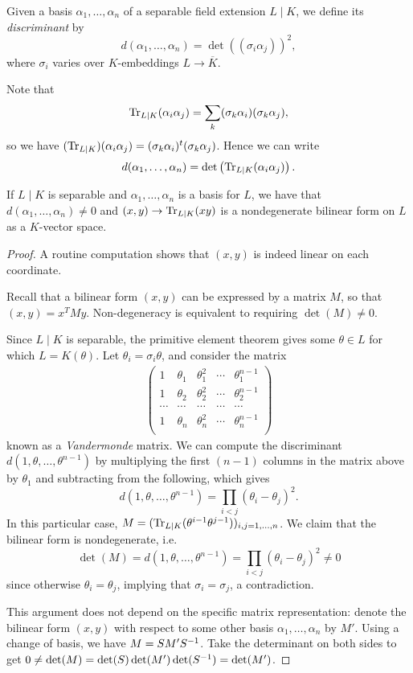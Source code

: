 \begin{defn}
	Given a basis $\alpha_1,\dots,\alpha_n$ of a separable field extension $L\mid K$, we define its \emph{discriminant} by
	\[
		d(\alpha_1,\dots,\alpha_n) = \det((\sigma_i\alpha_j))^2,
	\]
	where $\sigma_i$ varies over $K$-embeddings $L\to\overline{K}$.
\end{defn}

Note that
\[
	\operatorname{Tr}_{L\mid K}(\alpha_i\alpha_j) = \sum_k(\sigma_k\alpha_i)(\sigma_k\alpha_j),
\]
so we have $(\operatorname{Tr}_{L\mid K})(\alpha_i\alpha_j)=(\sigma_k\alpha_i)^t(\sigma_k\alpha_j)$. Hence we can write
\[
	d(\alpha_1,\dots,\alpha_n)=\det\left(\operatorname{Tr}_{L\mid K}(\alpha_i\alpha_j)\right).
\]


\begin{prop}
	If $L\mid K$ is separable and $\alpha_1,\dots,\alpha_n$ is a basis for $L$, we have that $d(\alpha_1,\dots,\alpha_n)\neq 0$ and $(x,y) \to \operatorname{Tr}_{L\mid K}(xy)$ is a nondegenerate bilinear form on $L$ as a $K$-vector space.
\end{prop}
\begin{proof}
	A routine computation shows that $(x,y)$ is indeed linear on each coordinate.

	Recall that a bilinear form $(x,y)$ can be expressed by a matrix $M$, so that $(x,y) = x^T M y$. Non-degeneracy is equivalent to requiring $\det(M)\neq 0$.
	
	Since $L\mid K$ is separable, the primitive element theorem gives some $\theta\in L$ for which $L=K(\theta)$. Let $\theta_i=\sigma_i\theta$, and consider the matrix
	\begin{align*}
	\begin{pmatrix}
		1 & \theta_1 & \theta_1^2 & \cdots & \theta_1^{n-1}\\
		1 & \theta_2 & \theta_2^2 & \cdots & \theta_2^{n-1}\\
		\cdots & \cdots &\cdots &\cdots &\cdots\\
		1 & \theta_n & \theta_n^2 & \cdots & \theta_n^{n-1}\\
	\end{pmatrix}
	\end{align*}
	known as a \emph{Vandermonde} matrix. We can compute the discriminant $d(1,\theta,\dots,\theta^{n-1})$ by multiplying the first $(n-1)$ columns in the matrix above by $\theta_1$ and subtracting from the following, which gives
	\[
		d(1,\theta,\dots,\theta^{n-1}) = \prod_{i<j}(\theta_i-\theta_j)^2.
	\]
	In this particular case, $M=(\operatorname{Tr}_{L\mid K}(\theta^{i-1}\theta^{j-1}))_{i,j=1,\dots,n}$. We claim that the bilinear form is nondegenerate, i.e.
	\[
		\det(M) = d(1,\theta,\dots,\theta^{n-1}) = \prod_{i<j}(\theta_i-\theta_j)^2 \neq 0
	\]
	since otherwise $\theta_i = \theta_j$, implying that $\sigma_i=\sigma_j$, a contradiction.

	This argument does not depend on the specific matrix representation: denote the bilinear form $(x,y)$ with respect to some other basis $\alpha_1,\dots,\alpha_n$ by $M'$. Using a change of basis, we have $M=SM'S^{-1}$. Take the determinant on both sides to get $0\neq\det(M)=\det(S)\det(M')\det(S^{-1})=\det(M')$.
\end{proof}



